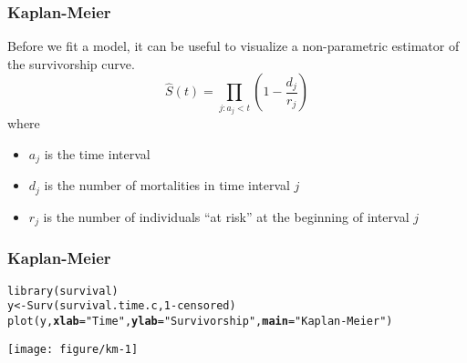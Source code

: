 \documentclass[color=usenames,dvipsnames]{beamer}\usepackage[]{graphicx}\usepackage[]{xcolor}
\makeatletter
\newcommand{\hlnum}[1]{\textcolor[rgb]{0.69,0.494,0}{#1}}%
\newcommand{\hlsng}[1]{\textcolor[rgb]{0.749,0.012,0.012}{#1}}%
\newcommand{\hlopt}[1]{\textcolor[rgb]{0,0,0}{#1}}%
\newcommand{\hldef}[1]{\textcolor[rgb]{0,0,0}{#1}}%
\newcommand{\hlkwb}[1]{\textcolor[rgb]{0,0.341,0.682}{#1}}%
\newcommand{\hlkwc}[1]{\textcolor[rgb]{0,0,0}{\textbf{#1}}}%
\newcommand{\hlkwd}[1]{\textcolor[rgb]{0.004,0.004,0.506}{#1}}%
\newenvironment{kframe}{%
 \def\at@end@of@kframe{}%
 \ifinner\ifhmode%
  \def\at@end@of@kframe{\end{minipage}}%
  \begin{minipage}{\columnwidth}%
 \fi\fi%
 \def\FrameCommand##1{\hskip\@totalleftmargin \hskip-\fboxsep
 \colorbox{shadecolor}{##1}\hskip-\fboxsep
     \hskip-\linewidth \hskip-\@totalleftmargin \hskip\columnwidth}%
 \MakeFramed {\advance\hsize-\width
   \@totalleftmargin\z@ \linewidth\hsize
   \@setminipage}}%
 {\par\unskip\endMakeFramed%
 \at@end@of@kframe}
\newenvironment{knitrout}{}{} %
\makeatother
\begin{document}
\begin{frame}[fragile]
  \frametitle{Kaplan-Meier}
  Before we fit a model, it can be useful to visualize a
  non-parametric estimator of the survivorship curve. \\
  \pause
  \vfill
  \[
    \hat{S}(t) = \prod_{j:a_j < t} \left(1 - \frac{d_j}{r_j}\right)
  \]
  where
  \begin{itemize}
    \item $a_j$ is the time interval
    \item $d_j$ is the number of mortalities in time interval $j$
    \item $r_j$ is the number of individuals ``at risk'' at the
      beginning of interval $j$
  \end{itemize}
\end{frame}



\begin{frame}[fragile]
  \frametitle{Kaplan-Meier}
\begin{knitrout}\footnotesize
{}\color{fgcolor}\begin{kframe}
\begin{alltt}
\hlkwd{library}\hldef{(survival)}
\hldef{y} \hlkwb{<-} \hlkwd{Surv}\hldef{(survival.time.c,} \hlnum{1}\hlopt{-}\hldef{censored)}
\hlkwd{plot}\hldef{(y,} \hlkwc{xlab}\hldef{=}\hlsng{"Time"}\hldef{,} \hlkwc{ylab}\hldef{=}\hlsng{"Survivorship"}\hldef{,} \hlkwc{main}\hldef{=}\hlsng{"Kaplan-Meier"}\hldef{)}
\end{alltt}
\end{kframe}

{\centering \texttt{[image: figure/km-1]} 

}


\end{knitrout}
\end{frame}
\end{document}
